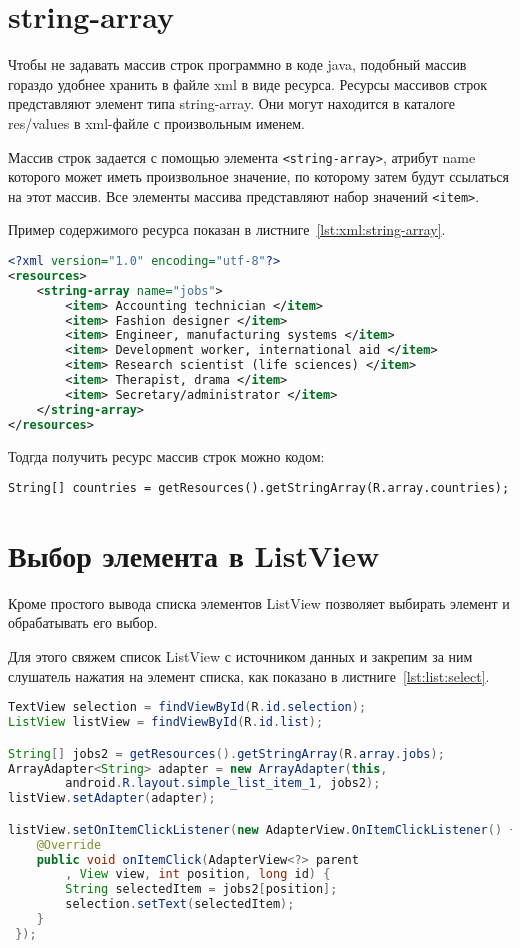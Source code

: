 \section{string-array}
Чтобы не задавать массив строк программно в коде java,
подобный массив гораздо удобнее хранить в файле xml в виде ресурса.
Ресурсы массивов строк представляют элемент типа string-array. Они могут
находится в каталоге res/values в xml-файле с произвольным именем.\par
Массив строк задается с помощью элемента \texttt{<string-array>}, атрибут
name которого может иметь произвольное значение, по которому затем будут
ссылаться на этот массив. Все элементы массива представляют набор
значений \texttt{<item>}.\par
Пример содержимого ресурса показан в листниге~\ref{lst:xml:string-array}.

\begin{lstlisting}[language=XML
	, label=lst:xml:string-array
	]
<?xml version="1.0" encoding="utf-8"?>
<resources>
    <string-array name="jobs">
		<item> Accounting technician </item>
		<item> Fashion designer </item>
		<item> Engineer, manufacturing systems </item>
		<item> Development worker, international aid </item>
		<item> Research scientist (life sciences) </item>
		<item> Therapist, drama </item>
		<item> Secretary/administrator </item>
    </string-array>
</resources>
\end{lstlisting}

Тодгда получить ресурс массив строк можно кодом:

\begin{verbatim}
String[] countries = getResources().getStringArray(R.array.countries);
\end{verbatim}

\section{Выбор элемента в ListView}
Кроме простого вывода списка элементов ListView позволяет выбирать
элемент и обрабатывать его выбор.\par
Для этого свяжем список ListView с источником данных и закрепим за ним
слушатель нажатия на элемент списка, как показано
в листниге~\ref{lst:list:select}.

\begin{lstlisting}[language=Java
	, label=lst:list:select
	]
TextView selection = findViewById(R.id.selection);
ListView listView = findViewById(R.id.list);

String[] jobs2 = getResources().getStringArray(R.array.jobs);
ArrayAdapter<String> adapter = new ArrayAdapter(this,
		android.R.layout.simple_list_item_1, jobs2);
listView.setAdapter(adapter);

listView.setOnItemClickListener(new AdapterView.OnItemClickListener() {
	@Override
	public void onItemClick(AdapterView<?> parent
		, View view, int position, long id) {
		String selectedItem = jobs2[position];
		selection.setText(selectedItem);
	}
 });
\end{lstlisting}

